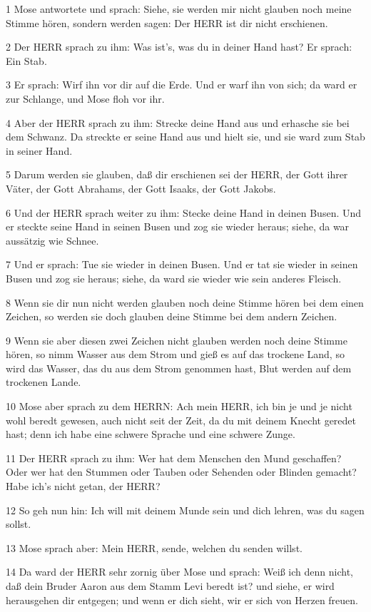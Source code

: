 \par 1 Mose antwortete und sprach: Siehe, sie werden mir nicht glauben noch meine Stimme hören, sondern werden sagen: Der HERR ist dir nicht erschienen.
\par 2 Der HERR sprach zu ihm: Was ist's, was du in deiner Hand hast? Er sprach: Ein Stab.
\par 3 Er sprach: Wirf ihn vor dir auf die Erde. Und er warf ihn von sich; da ward er zur Schlange, und Mose floh vor ihr.
\par 4 Aber der HERR sprach zu ihm: Strecke deine Hand aus und erhasche sie bei dem Schwanz. Da streckte er seine Hand aus und hielt sie, und sie ward zum Stab in seiner Hand.
\par 5 Darum werden sie glauben, daß dir erschienen sei der HERR, der Gott ihrer Väter, der Gott Abrahams, der Gott Isaaks, der Gott Jakobs.
\par 6 Und der HERR sprach weiter zu ihm: Stecke deine Hand in deinen Busen. Und er steckte seine Hand in seinen Busen und zog sie wieder heraus; siehe, da war aussätzig wie Schnee.
\par 7 Und er sprach: Tue sie wieder in deinen Busen. Und er tat sie wieder in seinen Busen und zog sie heraus; siehe, da ward sie wieder wie sein anderes Fleisch.
\par 8 Wenn sie dir nun nicht werden glauben noch deine Stimme hören bei dem einen Zeichen, so werden sie doch glauben deine Stimme bei dem andern Zeichen.
\par 9 Wenn sie aber diesen zwei Zeichen nicht glauben werden noch deine Stimme hören, so nimm Wasser aus dem Strom und gieß es auf das trockene Land, so wird das Wasser, das du aus dem Strom genommen hast, Blut werden auf dem trockenen Lande.
\par 10 Mose aber sprach zu dem HERRN: Ach mein HERR, ich bin je und je nicht wohl beredt gewesen, auch nicht seit der Zeit, da du mit deinem Knecht geredet hast; denn ich habe eine schwere Sprache und eine schwere Zunge.
\par 11 Der HERR sprach zu ihm: Wer hat dem Menschen den Mund geschaffen? Oder wer hat den Stummen oder Tauben oder Sehenden oder Blinden gemacht? Habe ich's nicht getan, der HERR?
\par 12 So geh nun hin: Ich will mit deinem Munde sein und dich lehren, was du sagen sollst.
\par 13 Mose sprach aber: Mein HERR, sende, welchen du senden willst.
\par 14 Da ward der HERR sehr zornig über Mose und sprach: Weiß ich denn nicht, daß dein Bruder Aaron aus dem Stamm Levi beredt ist? und siehe, er wird herausgehen dir entgegen; und wenn er dich sieht, wir er sich von Herzen freuen.
